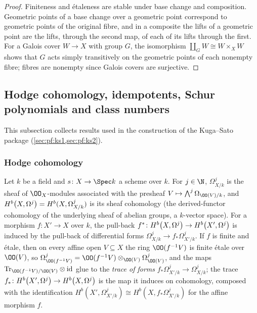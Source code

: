 \begin{proof}
Finiteness and \'etaleness are stable under base change and composition. Geometric points of a base change
over a geometric point correspond to geometric points of the original fibre, and in a composite the lifts of a
geometric point are the lifts, through the second map, of each of its lifts through the first. For a Galois
cover $W\to X$ with group $G$, the isomorphism $\coprod_GW\cong W\times_XW$ shows that $G$ acts simply
transitively on the geometric points of each nonempty fibre; fibres are nonempty since Galois covers are
surjective.
\end{proof}

\subsection{Hodge cohomology, idempotents, Schur polynomials and class numbers}\label{sec:pf:geo:hodge}

This subsection collects results used in the construction of the Kuga--Sato package
(\cref{sec:pf:ks1,sec:pf:ks2}).

\subsubsection{Hodge cohomology}

\begin{definition}\label{pf:geo:hodgedef}
Let $k$ be a field and $s\colon X\to\Spec k$ a scheme over $k$. For $j\in\N$, $\Omega^j_{X/k}$ is the sheaf of
$\OO_X$-modules associated with the presheaf $V\mapsto\bigwedge^j\Omega_{\OO(V)/k}$, and
$\geoHdg{X}{j}{b}=H^b(X,\Omega^j_{X/k})$ is its sheaf cohomology (the derived-functor cohomology of the
underlying sheaf of abelian groups, a $k$-vector space). For a morphism $f\colon X'\to X$ over $k$, the
pull-back $f^*\colon\geoHdg{X}{j}{b}\to\geoHdg{X'}{j}{b}$ is induced by the pull-back of differential forms
$\Omega^j_{X/k}\to f_*\Omega^j_{X'/k}$. If $f$ is finite and \'etale, then on every affine open $V\subseteq X$
the ring $\OO(f^{-1}V)$ is finite \'etale over $\OO(V)$, so $\Omega^j_{\OO(f^{-1}V)}=\OO(f^{-1}V)\otimes_{\OO(V)}
\Omega^j_{\OO(V)}$, and the maps $\mathrm{Tr}_{\OO(f^{-1}V)/\OO(V)}\otimes\mathrm{id}$ glue to the \emph{trace of forms}
$f_*\Omega^j_{X'/k}\to\Omega^j_{X/k}$; the trace $f_*\colon\geoHdg{X'}{j}{b}\to\geoHdg{X}{j}{b}$ is the map it
induces on cohomology, composed with the identification $H^b(X',\Omega^j_{X'/k})\cong H^b(X,f_*\Omega^j_{X'/k})$
for the affine morphism $f$.
\end{definition}

